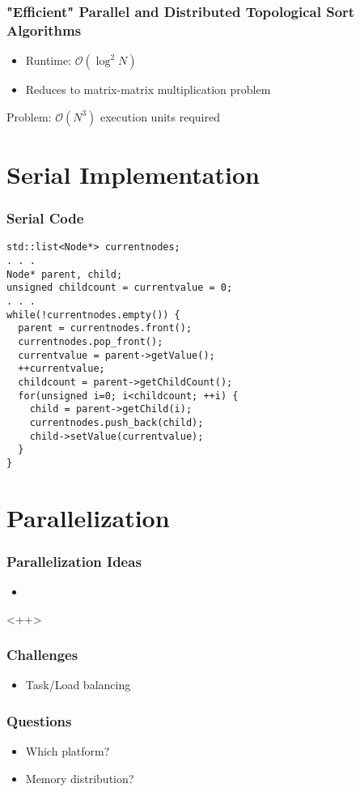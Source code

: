 \begin{frame}
\frametitle{"Efficient" Parallel and Distributed Topological Sort Algorithms}

\begin{itemize}
	\item Runtime: $\mathcal{O} (\log^2 N)$
	\item Reduces to matrix-matrix multiplication problem
\end{itemize}

\begin{block}{Problem:}
	$\mathcal{O} (N^3)$ execution units required
\end{block}


\end{frame}




\section{Serial Implementation}

\begin{frame}[fragile]
	\frametitle{Serial Code}
	\begin{lstlisting}[style=cpp]
std::list<Node*> currentnodes;
. . .
Node* parent, child;
unsigned childcount = currentvalue = 0;
. . .
while(!currentnodes.empty()) {
  parent = currentnodes.front();
  currentnodes.pop_front();
  currentvalue = parent->getValue();
  ++currentvalue;
  childcount = parent->getChildCount();
  for(unsigned i=0; i<childcount; ++i) {
    child = parent->getChild(i);
    currentnodes.push_back(child);
    child->setValue(currentvalue);
  }
}
\end{lstlisting}
\end{frame}


\section{Parallelization}
\begin{frame}

\frametitle{Parallelization Ideas}
\begin{itemize}
	\item 
\end{itemize}<++>
\end{frame}

\begin{frame}
\frametitle{Challenges}
\begin{itemize}
	\item Task/Load balancing
\end{itemize}
\end{frame}


\begin{frame}
\frametitle{Questions}
\begin{itemize}
	\item Which platform?
	\item Memory distribution?
\end{itemize}
\end{frame}


 
